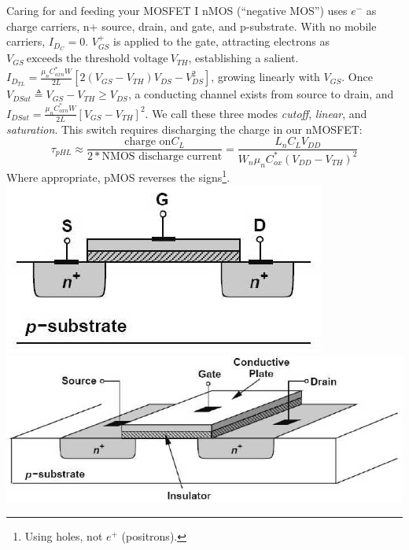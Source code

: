 \documentclass[mathserif,xcolor={dvipsnames,table}]{beamer}
\begin{document}
\begin{frame}{Caring for and feeding your MOSFET I}
\renewcommand\windowpagestuff{%
\texttt{[image: images/vtf.png]}
\par{\usebeamercolor[fg]{caption name}%
\usebeamerfont*{caption name}%
\usebeamertemplate{caption label separator}}%
\usebeamerfont*{caption}%
}
\opencutleft
{\scriptsize nMOS (``negative MOS'') uses
$e^{-}$ as charge carriers, n+ source, drain, and gate, and p-substrate. With no
mobile carriers, $I_{D_{C}} = 0$. $V^{+}_{GS}$
is applied to the gate, attracting electrons as $V_{GS}\ \text{exceeds the threshold
voltage}\ V_{TH}$, establishing a salient.
$I_{D_{TL}} = \frac{\mu_{n}C^{*}_{oxn}W}{2L}\left[2(V_{GS} - V_{TH})V_{DS} - V^{2}_{DS}\right]$, growing
linearly with $V_{GS}$. Once $V_{DSat}\triangleq V_{GS} - V_{TH} \ge V_{DS}$, a
conducting channel exists from source to drain, and $I_{DSat} = \frac{\mu_{n}C^{*}_{oxn}W}{2L}\left[V_{GS} - V_{TH}\right]^{2}$. We call these three modes \textit{cutoff},
\textit{linear}, and \textit{saturation}. This switch requires discharging the charge in our nMOSFET:\\
\begin{equation}
\tau_{pHL} \approx \frac{\text{charge on} C_L}{2 * \text{NMOS discharge current}} = \frac{L_{n}C_{L}V_{DD}}{W_{n}\mu_{n}C^{*}_{ox}\left(V_{DD} - V_{TH}\right)^{2}}
\end{equation}
Where appropriate, pMOS reverses the signs\footnote{Using holes, not $e^{+}$ (positrons).}.
}
\\
\vfill
\includegraphics[scale=.3]{images/oe-001.png}
\includegraphics[scale=.3]{images/oe-000.png}
\end{frame}
\end{document}
